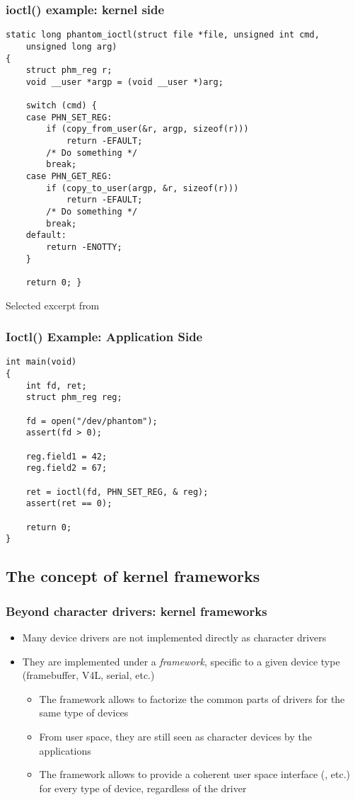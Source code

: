 \begin{frame}[fragile]
  \frametitle{ioctl() example: kernel side}
\begin{verbatim}
static long phantom_ioctl(struct file *file, unsigned int cmd,
    unsigned long arg)
{
    struct phm_reg r;
    void __user *argp = (void __user *)arg;

    switch (cmd) {
    case PHN_SET_REG:
        if (copy_from_user(&r, argp, sizeof(r)))
            return -EFAULT;
        /* Do something */
        break;
    case PHN_GET_REG:
        if (copy_to_user(argp, &r, sizeof(r)))
            return -EFAULT;
        /* Do something */
        break;
    default:
        return -ENOTTY;
    }

    return 0; }
\end{verbatim}
Selected excerpt from 
\end{frame}

\begin{frame}[fragile]
  \frametitle{Ioctl() Example: Application Side}
\begin{verbatim}
int main(void)
{
    int fd, ret;
    struct phm_reg reg;

    fd = open("/dev/phantom");
    assert(fd > 0);

    reg.field1 = 42;
    reg.field2 = 67;

    ret = ioctl(fd, PHN_SET_REG, & reg);
    assert(ret == 0);

    return 0;
}
\end{verbatim}
\end{frame}

\subsection{The concept of kernel frameworks}

\begin{frame}
  \frametitle{Beyond character drivers: kernel frameworks}
  \begin{itemize}
  \item Many device drivers are not implemented directly as character
    drivers
  \item They are implemented under a \emph{framework}, specific to a
    given device type (framebuffer, V4L, serial, etc.)
    \begin{itemize}
    \item The framework allows to factorize the common parts of
      drivers for the same type of devices
    \item From user space, they are still seen as character devices by
      the applications
    \item The framework allows to provide a coherent user space
      interface (, etc.) for every type of device,
      regardless of the driver
    \end{itemize}
  \end{itemize}
\end{frame}


